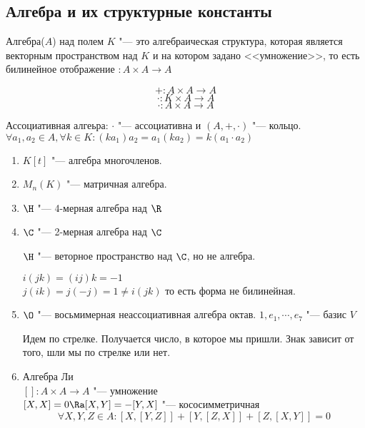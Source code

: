 \subsection{Алгебра и их структурные константы}
\begin{Def}
Алгебра($A$) над полем $K$ "--- это алгебраическая  структура, которая является векторным пространством
над $K$ и на котором задано <<умножение>>, то есть билинейное отображение $\colon A \times A \to A$

$$+ \colon A \times A \to A$$
$$\cdot \colon K \times A \to A$$
$$\cdot \colon A \times A \to A$$

\end{Def}
\begin{Def}
    Ассоциативная алгеьра: $\cdot$ "--- ассоциативна и $(A, +, \cdot)$ "--- кольцо.\\ 
    $\forall a_1, a_2 \in A, \forall k \in K \colon (ka_1)a_2 = a_1(ka_2) = k(a_1 \cdot a_2)$\\
\end{Def}
\begin{exmp}\hfill
    \begin{enumerate}
    \item
    $K[t]$ "--- алгебра многочленов.\\
    \item
    $M_n(K)$ "--- матричная алгебра.\\
    \item
    $\H$ "--- 4-мерная алгебра над $\R$\\
    \item
    $\C$ "--- 2-мерная алгебра над $\C$\\
    \begin{Rem}
    $\H$ "--- веторное пространство над $\C$, но не алгебра. 

    $i(jk) = (ij) k = -1$\\
    $j(ik) = j(-j) = 1 \ne i(jk)$
     то есть форма не билинейная. 
    \end{Rem}
    \item
    $\O$ "--- восьмимерная неассоциативная алгебра октав. 
    $1, e_1, \cdots, e_7$ "--- базис $V$

        
    Идем по стрелке. Получается число, в которое мы пришли. Знак зависит от того, шли мы по стрелке или нет. 
    \item Алгебра Ли \\
    $[]\colon A \times A \to A $ "--- умножение\\
    $[X, X] = 0 \Ra [X, Y] = -[Y, X]$ "--- кососимметричная\\
    $$\forall X, Y, Z\in A \colon [X, [Y, Z]] + [Y, [Z, X]] + [Z, [X, Y]] = 0$$
    \end{enumerate}
\end{exmp}

